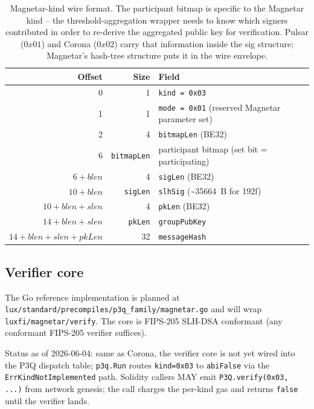 \begin{table}[h]
\centering
\small
\begin{tabular}{@{}rrl@{}}
\toprule
\textbf{Offset} & \textbf{Size} & \textbf{Field} \\
\midrule
0 & 1 & \texttt{kind = 0x03} \\
1 & 1 & \texttt{mode = 0x01} (reserved Magnetar parameter set) \\
2 & 4 & \texttt{bitmapLen} (BE32) \\
6 & \texttt{bitmapLen} & participant bitmap (set bit = participating) \\
$6{+}\textit{blen}$ & 4 & \texttt{sigLen} (BE32) \\
$10{+}\textit{blen}$ & \texttt{sigLen} & \texttt{slhSig} (\textasciitilde\SI{35664}{B} for 192f) \\
$10{+}\textit{blen}{+}\textit{slen}$ & 4 & \texttt{pkLen} (BE32) \\
$14{+}\textit{blen}{+}\textit{slen}$ & \texttt{pkLen} & \texttt{groupPubKey} \\
$14{+}\textit{blen}{+}\textit{slen}{+}\textit{pkLen}$ & 32 & \texttt{messageHash} \\
\bottomrule
\end{tabular}
\caption{Magnetar-kind wire format. The participant bitmap is
specific to the Magnetar kind -- the threshold-aggregation
wrapper needs to know which signers contributed in order to
re-derive the aggregated public key for verification. Pulsar
($0x01$) and Corona ($0x02$) carry that information inside the
sig structure; Magnetar's hash-tree structure puts it in the
wire envelope.}
\label{tab:magnetar-wire}
\end{table}

\subsection{Verifier core}

The Go reference implementation is planned at
\texttt{lux/standard/precompiles/p3q\_family/magnetar.go} and
will wrap \texttt{luxfi/magnetar/verify}. The core is FIPS-205
SLH-DSA conformant (any conformant FIPS-205 verifier suffices).

Status as of 2026-06-04: same as Corona, the verifier core is
not yet wired into the P3Q dispatch table; \texttt{p3q.Run}
routes \texttt{kind=0x03} to \texttt{abiFalse} via the
\texttt{ErrKindNotImplemented} path. Solidity callers MAY emit
\texttt{P3Q.verify(0x03, ...)} from network genesis; the call
charges the per-kind gas and returns \texttt{false} until the
verifier lands.

